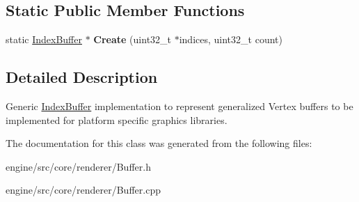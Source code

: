 \subsection*{Static Public Member Functions}
\begin{DoxyCompactItemize}
\item 
\mbox{\label{classengine_1_1renderer_1_1IndexBuffer_a745efbbda6626a5dd4dd99d78018fe59}} 
static \hyperlink{classengine_1_1renderer_1_1IndexBuffer}{Index\+Buffer} $\ast$ {\bfseries Create} (uint32\+\_\+t $\ast$indices, uint32\+\_\+t count)
\end{DoxyCompactItemize}


\subsection{Detailed Description}
Generic \hyperlink{classengine_1_1renderer_1_1IndexBuffer}{Index\+Buffer} implementation to represent generalized Vertex buffers to be implemented for platform specific graphics libraries. 

The documentation for this class was generated from the following files\+:\begin{DoxyCompactItemize}
\item 
engine/src/core/renderer/Buffer.\+h\item 
engine/src/core/renderer/Buffer.\+cpp\end{DoxyCompactItemize}
